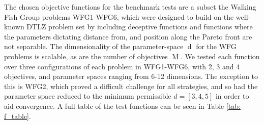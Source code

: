 \documentclass[conference]{IEEEtran}
\DeclareMathOperator*{\ndim}{d}
\DeclareMathOperator*{\nobj}{M}
\begin{document}

The chosen objective functions for the benchmark tests are a subset the Walking Fish Group problems \cite{huband2005scalable} WFG1-WFG6, which were designed to build on the well-known DTLZ problem set \cite{deb2005scalable} by including deceptive functions and functions where the parameters dictating distance from, and position along the Pareto front are not separable. The dimensionality of the parameter-space $\ndim$ for the WFG problems is scalable, as are the number of objectives $\nobj$. We tested each function over three configurations of each problem in WFG1-WFG6, with 2, 3 and 4 objectives, and parameter spaces ranging from 6-12 dimensions. The exception to this is WFG2, which proved a difficult challenge for all strategies, and so had the parameter space reduced to the minimum permissible $d=[3, 4, 5]$ in order to aid convergence. A full table of the test functions can be seen in Table \ref{tab: f_table}.
\end{document}
